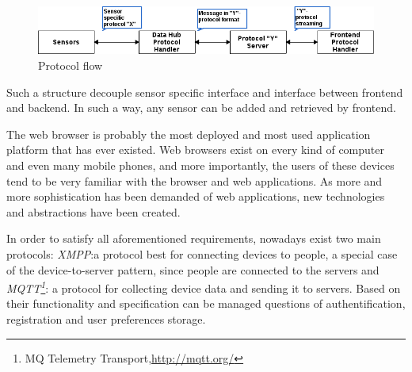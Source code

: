       \begin{figure}[!ht]
      \centering
      \includegraphics[scale=0.6]{images/Protocol_flow.png}   
      \caption[Protocol flow]{Protocol flow}
      \label{img:protocol}                           
      \end{figure}
      Such a structure decouple sensor specific interface and interface between frontend and backend. In such a way, any sensor can be added and retrieved by frontend. 
    
      The web browser is probably the most deployed and most used application platform that has ever existed. Web browsers exist on every kind of computer and even many mobile phones, and more importantly, the users of these devices tend to be very familiar with the browser and web applications. As more and more sophistication has been demanded of web applications, new technologies and abstractions have been created.

      In order to satisfy all aforementioned requirements, nowadays exist two main protocols: \emph{XMPP\cite{XMPPbook}}:a protocol best for connecting devices to people, a special case of the device-to-server pattern, since people are connected to the servers and \emph{MQTT\footnote{MQ Telemetry Transport,\url{http://mqtt.org/}}}: a protocol for collecting device data and sending it to servers. Based on their functionality and specification can be managed questions of authentification, registration and user preferences storage.

